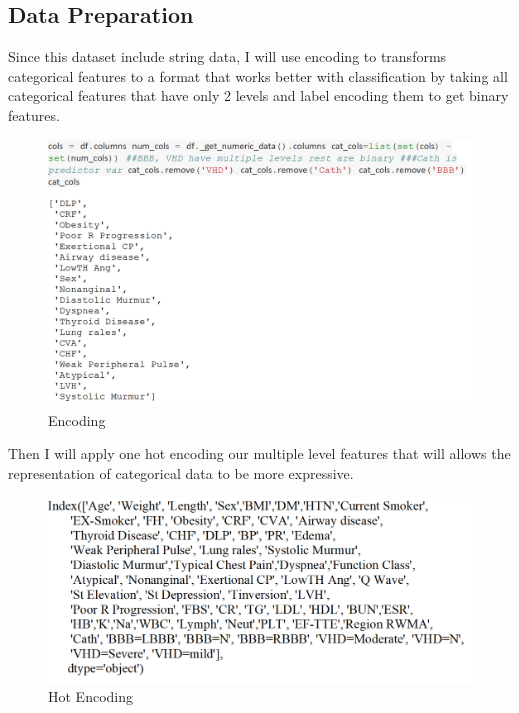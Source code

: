 \documentclass[sigconf]{acmart}
\begin{document}
\subsection{Data Preparation}
Since this dataset include string data, I will use encoding to transforms categorical features to a format that works better with classification by taking all categorical features that have only 2 levels and label encoding them to get binary features. 

\begin{figure}
    \centering
    \includegraphics[width=1.0\columnwidth]{project/images/Untitled3.png}
    \caption{Encoding}
    \label{Encoding}
\end{figure}

Then I will apply one hot encoding our multiple level features that will allows the representation of categorical data to be more expressive.

\begin{figure}
    \centering
    \includegraphics[width=1.0\columnwidth]{project/images/Encoding.png}
    \caption{Hot Encoding}
    \label{Hot Enco}
\end{figure}
    
\end{document}
